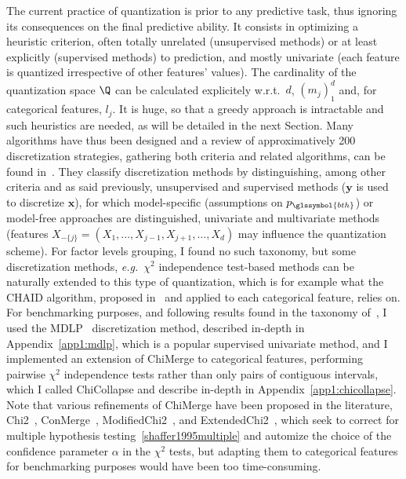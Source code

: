 The current practice of quantization is prior to any predictive task, thus ignoring its consequences on the final predictive ability. It consists in optimizing a heuristic criterion, often totally unrelated (unsupervised methods) or at least explicitly (supervised methods) to prediction, and mostly univariate (each feature is quantized irrespective of other features' values). The cardinality of the quantization space $\Q$ can be calculated explicitely w.r.t.\ $d$, $(m_j)_1^d$ and, for categorical features, $l_j$. It is huge, so that a greedy approach is intractable and such heuristics are needed, as will be detailed in the next Section.
Many algorithms have thus been designed and a review of approximatively 200 discretization strategies, gathering both criteria and related algorithms, can be found in~\cite{ramirez2016data}. They classify discretization methods by distinguishing, among other criteria and as said previously, unsupervised and supervised methods ($\bm{y}$ is used to discretize $\bm{x}$), for which model-specific (assumptions on $p_{\glssymbol{bth}}$) or model-free approaches are distinguished, univariate and multivariate methods (features $X_{-\{j\}} = (X_{1},\ldots,X_{j-1},X_{j+1},\ldots,X_{d})$ may influence the quantization scheme). For factor levels grouping, I found no such taxonomy, but some discretization methods, \textit{e.g.}\ $\chi^2$ independence test-based methods can be naturally extended to this type of quantization, which is for example what the CHAID algorithm, proposed in~\cite{kass1980exploratory} and applied to each categorical feature, relies on.
For benchmarking purposes, and following results found in the taxonomy of~\cite{ramirez2016data}, I used the MDLP~\cite{fayyad1993multi} discretization method, described in-depth in Appendix~\ref{app1:mdlp}, which is a popular supervised univariate method, and I implemented an extension of ChiMerge to categorical features, performing pairwise $\chi^2$ independence tests rather than only pairs of contiguous intervals, which I called ChiCollapse and describe in-depth in Appendix~\ref{app1:chicollapse}. Note that various refinements of ChiMerge have been proposed in the literature, Chi2~\cite{liu1995chi2}, ConMerge~\cite{wang1998concurrent}, ModifiedChi2~\cite{tay2002modified}, and ExtendedChi2~\cite{su2005extended}, which seek to correct for multiple hypothesis testing~\ref{shaffer1995multiple} and automize the choice of the confidence parameter $\alpha$ in the $\chi^2$ tests, but adapting them to categorical features for benchmarking purposes would have been too time-consuming.


